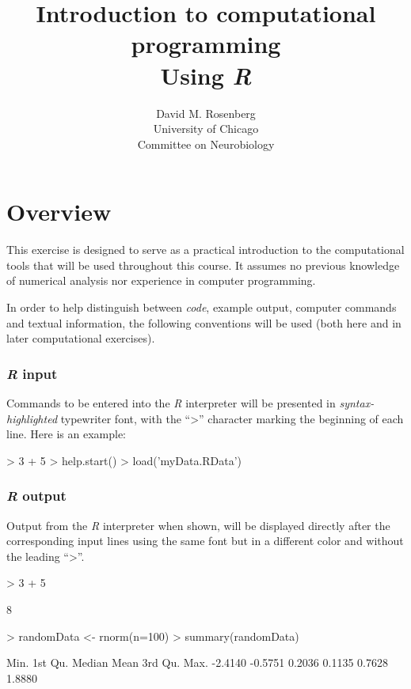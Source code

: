 \documentclass[10pt,letterpaper]{article}
\title{Introduction to computational programming\\\smaller Using \emph{R}}
\author{David M. Rosenberg\\\smaller University of Chicago\\\smaller Committee on Neurobiology}
\newenvironment{Schunk}{}{}
\begin{document}
\maketitle

\section*{Overview}

This exercise is designed to serve as a practical introduction to the computational tools that will be used throughout this course.  It assumes no previous knowledge of numerical analysis nor experience in computer programming.

In order to help distinguish between \emph{code}, example output, computer commands and textual information, the following conventions will be used (both here and in later computational exercises).

\subsubsection*{\emph{R} input}

Commands to be entered into the \emph{R} interpreter will be presented in \emph{syntax-highlighted} typewriter font, with the ``>'' character marking the beginning of each line.  Here is an example:

\begin{Schunk}
\begin{Sinput}
> 3 + 5
> help.start()
> load('myData.RData')
\end{Sinput}
\end{Schunk}

\subsubsection*{\emph{R} output}

Output from the \emph{R} interpreter when shown, will be displayed directly after the corresponding input lines using the same font but in a different color and without the leading ``>''.

\begin{Schunk}
\begin{Sinput}
> 3 + 5
\end{Sinput}
\begin{Soutput}
[1] 8
\end{Soutput}
\begin{Sinput}
> randomData <- rnorm(n=100)
> summary(randomData)
\end{Sinput}
\begin{Soutput}
   Min. 1st Qu.  Median    Mean 3rd Qu.    Max. 
-2.4140 -0.5751  0.2036  0.1135  0.7628  1.8880 
\end{Soutput}
\end{Schunk}
\end{document}
